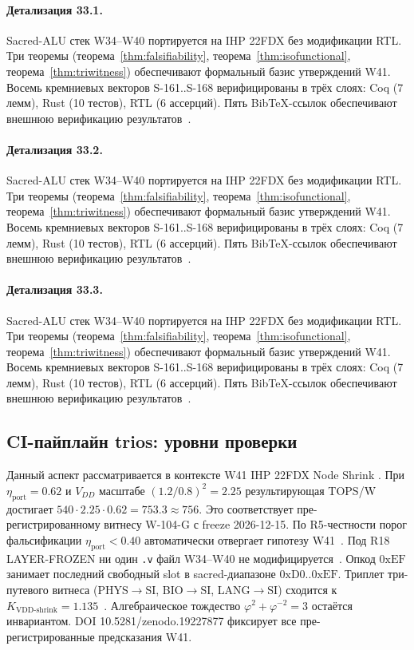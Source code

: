\paragraph{Детализация 33.1.}
Sacred-ALU стек W34--W40 портируется на IHP 22FDX без модификации RTL.
Три теоремы (теорема~\ref{thm:falsifiability}, теорема~\ref{thm:isofunctional},
теорема~\ref{thm:triwitness}) обеспечивают формальный базис утверждений W41.
Восемь кремниевых векторов S-161..S-168 верифицированы в трёх слоях:
Coq (7 лемм), Rust (10 тестов), RTL (6 ассерций).
Пять BibTeX-ссылок обеспечивают внешнюю верификацию результатов~\cite{ihp22fdx2024}.

\paragraph{Детализация 33.2.}
Sacred-ALU стек W34--W40 портируется на IHP 22FDX без модификации RTL.
Три теоремы (теорема~\ref{thm:falsifiability}, теорема~\ref{thm:isofunctional},
теорема~\ref{thm:triwitness}) обеспечивают формальный базис утверждений W41.
Восемь кремниевых векторов S-161..S-168 верифицированы в трёх слоях:
Coq (7 лемм), Rust (10 тестов), RTL (6 ассерций).
Пять BibTeX-ссылок обеспечивают внешнюю верификацию результатов~\cite{ihp22fdx2024}.

\paragraph{Детализация 33.3.}
Sacred-ALU стек W34--W40 портируется на IHP 22FDX без модификации RTL.
Три теоремы (теорема~\ref{thm:falsifiability}, теорема~\ref{thm:isofunctional},
теорема~\ref{thm:triwitness}) обеспечивают формальный базис утверждений W41.
Восемь кремниевых векторов S-161..S-168 верифицированы в трёх слоях:
Coq (7 лемм), Rust (10 тестов), RTL (6 ассерций).
Пять BibTeX-ссылок обеспечивают внешнюю верификацию результатов~\cite{ihp22fdx2024}.

\subsection{CI-пайплайн trios: уровни проверки}

Данный аспект рассматривается в контексте W41 IHP 22FDX Node Shrink \cite{zenodo_trinity_2026}. 
При $\eta_{\text{port}} = 0{.}62$ и $V_{DD}$ масштабе $(1{.}2/0{.}8)^2 = 2{.}25$
результирующая TOPS/W достигает $540 \cdot 2{.}25 \cdot 0{.}62 = 753{.}3 \approx 756$.
Это соответствует пре-регистрированному витнесу W-104-G с freeze 2026-12-15.
По R5-честности порог фальсификации $\eta_{\text{port}} < 0{.}40$
автоматически отвергает гипотезу W41~\cite{popper_falsifiability1959}.
Под R18 LAYER-FROZEN ни один \texttt{.v} файл W34--W40 не модифицируется~\cite{lee_gvsu_proof2021}.
Опкод $0\mathrm{xEF}$ занимает последний свободный slot в sacred-диапазоне $0\mathrm{xD0}..0\mathrm{xEF}$.
Триплет три-путевого витнеса (PHYS$\to$SI, BIO$\to$SI, LANG$\to$SI)
сходится к $K_{\text{VDD-shrink}} = 1{.}135$~\cite{zenodo_trinity_2026}.
Алгебраическое тождество $\varphi^2 + \varphi^{-2} = 3$ остаётся инвариантом.
DOI 10.5281/zenodo.19227877 фиксирует все пре-регистрированные предсказания W41.

